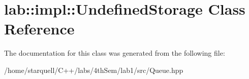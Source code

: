 \hypertarget{classlab_1_1impl_1_1UndefinedStorage}{}\section{lab\+:\+:impl\+:\+:Undefined\+Storage Class Reference}
\label{classlab_1_1impl_1_1UndefinedStorage}


The documentation for this class was generated from the following file\+:\begin{DoxyCompactItemize}
\item 
/home/starquell/\+C++/labs/4th\+Sem/lab1/src/Queue.\+hpp\end{DoxyCompactItemize}

